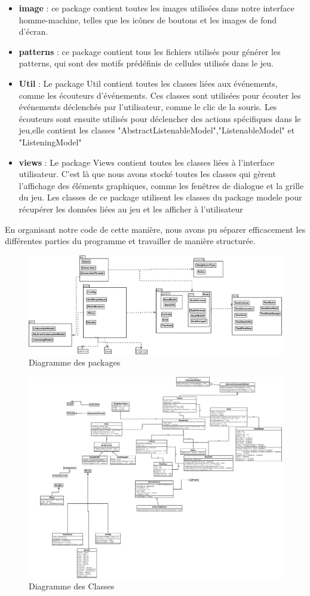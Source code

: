 \begin{itemize}
\item \textbf{image} : ce package contient toutes les images utilisées dans notre interface homme-machine, telles que les icônes de boutons et les images de fond d'écran.
\item \textbf{patterns} : ce package contient tous les fichiers utilisés pour générer les patterns, qui sont des motifs prédéfinis de cellules utilisés dans le jeu.
\item\textbf{Util} : Le package Util contient toutes les classes liées aux événements, comme les
écouteurs d’événements. Ces classes sont utilisées pour écouter les événements
déclenchés par l’utilisateur, comme le clic de la souris. Les écouteurs sont ensuite utilisés pour déclencher des actions spécifiques dans le jeu,elle contient les classes "AbstractListenableModel","ListenableModel" et "ListeningModel"
\item\textbf{views} : Le package Views contient toutes les classes liées à l’interface utilisateur.
C’est là que nous avons stocké toutes les classes qui gèrent l’affichage des
éléments graphiques, comme les fenêtres de dialogue et la grille du jeu. Les
classes de ce package utilisent les classes du package modele pour récupérer les
données liées au jeu et les afficher à l’utilisateur
\end{itemize}
 En organisant notre code de cette manière, nous avons pu séparer efficacement les différentes parties du programme et travailler de manière structurée.
\newpage
\begin{figure}[h]
		\centering
      \raggedright  
		\includegraphics[width=16cm]{images/package.PNG}
	    \caption{Diagramme des packages }
\end{figure}
\newpage
\begin{figure}[h]
		\centering
      \raggedright   
		\includegraphics[width=17cm]{images/classes.png}
	    \caption{Diagramme des Classes }
\end{figure}